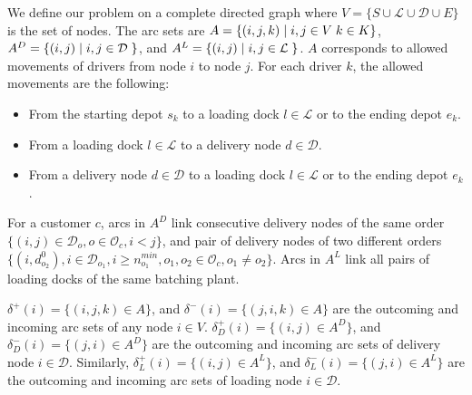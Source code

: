 \documentclass{article}
\begin{document}
We define our problem on a complete directed graph where $V=\{ S \cup \mathcal{L} \cup \mathcal{D} \cup E\}$ is the set of nodes. The arc sets are $A =  \{(i,j,k) \hspace*{1mm} \vert \hspace*{1mm} i, j \in V \hspace{1mm} k\in K \}$, $A^D = \{(i,j) \hspace*{1mm} \vert \hspace*{1mm} i, j \in \mathcal{D} \hspace{1mm} \}$, and $A^L = \{(i,j) \hspace*{1mm} \vert \hspace*{1mm} i, j \in \mathcal{L} \hspace{1mm} \}$. 
$A$ corresponds to allowed movements of drivers from node $i$ to node $j$. For each driver $k$, the allowed movements are the following:
\begin{itemize}
    \item From the starting depot $s_k$ to a loading dock $l \in \mathcal{L}$ or to the ending depot $e_k$.
    \item From a loading dock $l \in \mathcal{L}$ to a delivery node $d \in \mathcal{D}$.
    \item From a delivery node  $d \in \mathcal{D}$ to a loading dock $l \in \mathcal{L}$ or to the ending depot $e_k$.
\end{itemize}

For a customer $c$, arcs in $A^D$ link consecutive delivery nodes of the same order   $\lbrace (i,j)\in \mathcal{D}_o, o \in \mathcal{O}_c, i < j  \rbrace$, and pair of delivery nodes of two different orders $ \lbrace (i,d^{0}_{o_2}),  i \in \mathcal{D}_{o_1}, i \geq n^{min}_{o_1}, o_1, o_2 \in \mathcal{O}_c, o_1 \neq o_2 \rbrace $. Arcs in $A^L$ link all pairs of loading docks of the same batching plant.

$\delta^{+}(i) = \{(i, j,k) \in A \}$, and $\delta^{-}(i) = \{(j, i,k) \in A \}$ are the outcoming and incoming arc sets of any node $i \in V$. $\delta^{+}_D(i) = \{(i, j)  \in A^D\}$, and $\delta^{-}_D(i) = \{(j, i) \in A^D \}$ are the outcoming and incoming arc sets of delivery node $i \in \mathcal{D}$.  Similarly, $\delta^{+}_L(i) = \{(i, j)  \in A^L\}$, and $\delta^{-}_L(i) = \{(j, i) \in A^L \}$ are the outcoming and incoming arc sets of loading node $i \in \mathcal{D}$.
\end{document}
